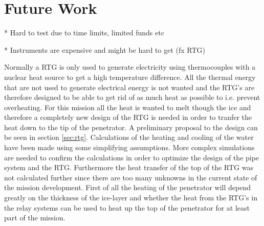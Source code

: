 \chapter{Future Work}

* Hard to test due to time limits, limited funds etc

    * Instruments are expensive and might be hard to get (fx RTG)

Normally a RTG is only used to generate electricity using thermocouples with a nuclear heat source to get a high temperature difference. All the thermal energy that are not used to generate electrical energy is not wanted and the RTG's are therefore designed to be able to get rid of as much heat as possible to i.e. prevent overheating. For this mission all the heat is wanted to melt though the ice and therefore a completely new design of the RTG is needed in order to tranfer the heat down to the tip of the penetrator. A preliminary proposal to the design can be seen in section \ref{sec:rtg}. Calculations of the heating and cooling of the water have been made using some simplifying assumptions. More complex simulations are needed to confirm the calculations in order to optimize the design of the pipe system and the RTG. Furthermore the heat transfer of the top of the RTG was not calculated further since there are too many unknowns in the current state of the mission development. First of all the heating of the penetrator will depend greatly on the thickness of the ice-layer and whether the heat from the RTG's in the relay systems can be used to heat up the top of the penetrator for at least part of the mission. 